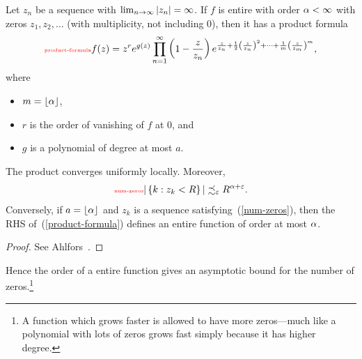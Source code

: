 \begin{thm}
Let $z_n$ be a sequence with $\lim_{n\to \infty} |z_n|=\infty$.
If $f$ is entire with order $\alpha<\infty$ with zeros $z_1,z_2,\ldots$ (with multiplicity, not including 0), then it has a product formula
\begin{equation}\llabel{product-formula}
f(z)=z^re^{g(z)} \prod_{n=1}^{\iy} \pa{1-\frac{z}{z_n}}e^{
\frac{z}{z_n}+\rc2 \pf{z}{z_n}^2+\cdots +\rc{m}\pf{z}{z_m}^{m}
},
\end{equation}
where
\begin{itemize}
\item $m=\left\lfloor {\alpha}\right\rfloor$,
\item $r$ is the order of vanishing of $f$ at 0, and
\item $g$ is a polynomial of degree at most $a$.
\end{itemize}
The product converges uniformly locally. Moreover, 
\begin{equation}\llabel{num-zeros}
|\set{k}{z_k<R}|\precsim_{\ep} R^{\al+\ep}.
\end{equation}
Conversely, if $a=\left\lfloor {\alpha}\right\rfloor$ and $z_k$ is a sequence satisfying~(\ref{num-zeros}), then the RHS of~(\ref{product-formula}) defines an entire function of order at most $\alpha$.
\end{thm}
\begin{proof}
See Ahlfors~\cite[p. 195]{Ah79}.
\end{proof}
Hence the order of a entire function gives an asymptotic bound for the number of zeros.\footnote{A function which grows faster is allowed to have more zeros---much like a polynomial with lots of zeros grows fast simply because it has higher degree.}
